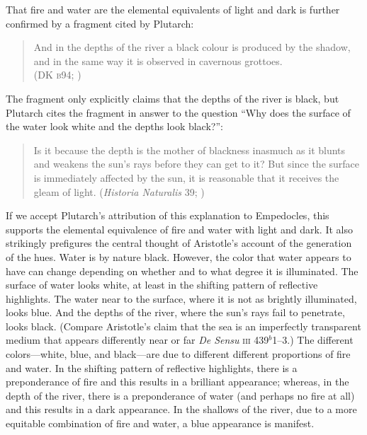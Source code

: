 That fire and water are the elemental equivalents of light and dark is further confirmed by a fragment cited by Plutarch:
\begin{verse}
    And in the depths of the river a black colour is produced by the shadow,\\
    and in the same way it is observed in cavernous grottoes.\\
    (DK \textsc{b}94; \citealt[105 261]{Inwood:2001ve})
\end{verse}
The fragment only explicitly claims that the depths of the river is black, but Plutarch cites the fragment in answer to the question ``Why does the surface of the water look white and the depths look black?'':
\begin{quote}
    Is it because the depth is the mother of blackness inasmuch as it blunts and weakens the sun's rays before they can get to it? But since the surface is immediately affected by the sun, it is reasonable that it receives the gleam of light.  (\emph{Historia Naturalis} 39; \citealt[\textsc{CTXT}-87 137--138]{Inwood:2001ve})
\end{quote}
If we accept Plutarch's attribution of this explanation to Empedocles, this supports the elemental equivalence of fire and water with light and dark. It also strikingly prefigures the central thought of Aristotle's account of the generation of the hues. Water is by nature black. However, the color that water appears to have can change depending on whether and to what degree it is illuminated. The surface of water looks white, at least in the shifting pattern of reflective highlights. The water near to the surface, where it is not as brightly illuminated, looks blue. And the depths of the river, where the sun's rays fail to penetrate, looks black. (Compare Aristotle's claim that the sea is an imperfectly transparent medium that appears differently near or far \emph{De Sensu} \textsc{iii} 439\( ^{b} \)1--3.) The different colors---white, blue, and black---are due to different different proportions of fire and water. In the shifting pattern of reflective highlights, there is a preponderance of fire and this results in a brilliant appearance; whereas, in the depth of the river, there is a preponderance of water (and perhaps no fire at all) and this results in a dark appearance. In the shallows of the river, due to a more equitable combination of fire and water, a blue appearance is manifest.

